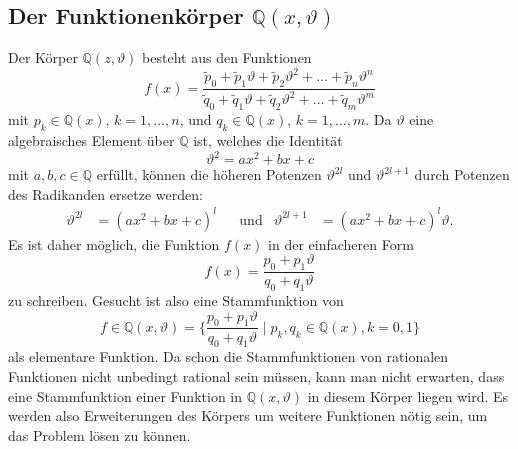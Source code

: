 %
%
\subsection{Der Funktionenkörper $\mathbb{Q}(x,\vartheta)$
\label{buch:intalg:wurzel:subsection:koerper}}
Der Körper $\mathbb{Q}(z,\vartheta)$ besteht aus den Funktionen
\[
f(x)
=
\frac{
\tilde{p}_0 + \tilde{p}_1\vartheta + \tilde{p}_2\vartheta^2
+ \ldots + \tilde{p}_n\vartheta^n
}{
\tilde{q}_0 + \tilde{q}_1\vartheta + \tilde{q}_2\vartheta^2
+ \ldots + \tilde{q}_m\vartheta^m
}
\]
mit $p_k\in\mathbb{Q}(x)$, $k=1,\dots,n$, und $q_k\in\mathbb{Q}(x)$,
$k=1,\dots,m$.
Da $\vartheta$ eine algebraisches Element über $\mathbb{Q}$ ist, welches
die Identität
\[
\vartheta^2 = ax^2 +bx +c
\]
mit $a,b,c\in\mathbb{Q}$ erfüllt, können die höheren Potenzen
$\vartheta^{2l}$ und $\vartheta^{2l+1}$ durch Potenzen des Radikanden
ersetze werden:
\begin{align*}
\vartheta^{2l}
&=
(ax^2 + bx + c)^l
&&\text{und}&
\vartheta^{2l+1}
&=
(ax^2 + bx + c)^l \vartheta.
\end{align*}
Es ist daher möglich, die Funktion $f(x)$ in der einfacheren Form
\begin{equation}
f(x)
=
\frac{p_0+p_1\vartheta}{q_0+q_1\vartheta}
\label{buch:algint:wurzel:eqn:funktion}
\end{equation}
zu schreiben.
Gesucht ist also eine Stammfunktion von
\[
f
\in
\mathbb{Q}(x,\vartheta)
=
\biggl\{
\frac{p_0+p_1\vartheta}{q_0+q_1\vartheta}
\;
\bigg|
\;
p_k,q_k\in\mathbb{Q}(x), k=0,1
\biggr\}
\]
als elementare Funktion.
Da schon die Stammfunktionen von rationalen Funktionen nicht unbedingt
rational sein müssen, kann man nicht erwarten, dass eine Stammfunktion
einer Funktion in $\mathbb{Q}(x,\vartheta)$ in diesem Körper liegen wird.
Es werden also Erweiterungen des Körpers um weitere Funktionen nötig sein,
um das Problem lösen zu können.

